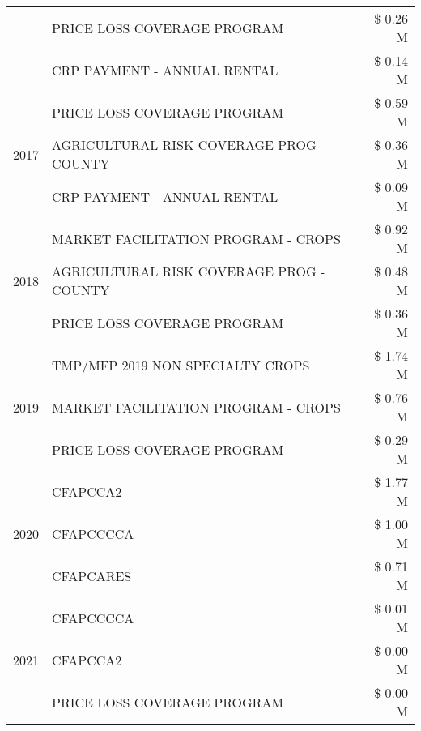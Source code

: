 \begin{tabular}{llr}
 & PRICE LOSS COVERAGE PROGRAM & \$ 0.26 M \\
 & CRP PAYMENT - ANNUAL RENTAL & \$ 0.14 M \\
\cline{1-3}
\multirow[t]{3}{*}{2017} & PRICE LOSS COVERAGE PROGRAM & \$ 0.59 M \\
 & AGRICULTURAL RISK COVERAGE PROG - COUNTY & \$ 0.36 M \\
 & CRP PAYMENT - ANNUAL RENTAL & \$ 0.09 M \\
\cline{1-3}
\multirow[t]{3}{*}{2018} & MARKET FACILITATION PROGRAM - CROPS & \$ 0.92 M \\
 & AGRICULTURAL RISK COVERAGE PROG - COUNTY & \$ 0.48 M \\
 & PRICE LOSS COVERAGE PROGRAM & \$ 0.36 M \\
\cline{1-3}
\multirow[t]{3}{*}{2019} & TMP/MFP 2019 NON SPECIALTY CROPS & \$ 1.74 M \\
 & MARKET FACILITATION PROGRAM - CROPS & \$ 0.76 M \\
 & PRICE LOSS COVERAGE PROGRAM & \$ 0.29 M \\
\cline{1-3}
\multirow[t]{3}{*}{2020} & CFAPCCA2 & \$ 1.77 M \\
 & CFAPCCCCA & \$ 1.00 M \\
 & CFAPCARES & \$ 0.71 M \\
\cline{1-3}
\multirow[t]{3}{*}{2021} & CFAPCCCCA & \$ 0.01 M \\
 & CFAPCCA2 & \$ 0.00 M \\
 & PRICE LOSS COVERAGE PROGRAM & \$ 0.00 M \\
\cline{1-3}
\bottomrule
\end{tabular}
